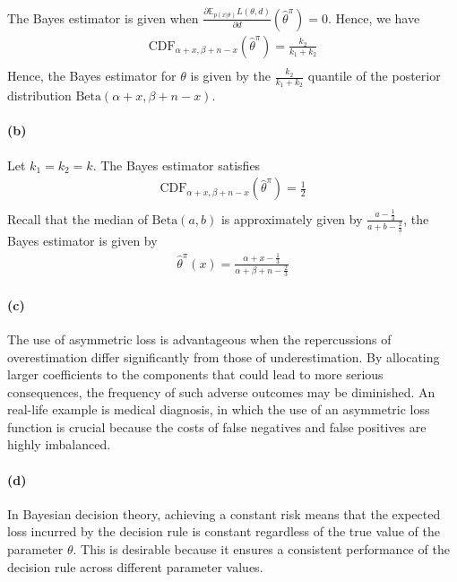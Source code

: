 The Bayes estimator is given when $\frac{\partial \mathbb{E}_{p(x \vert \theta)} L(\theta, d)}{\partial d} (\hat{\theta}^\pi) = 0$. Hence, we have
\begin{align*}
    \mathrm{CDF}_{\alpha+x, \beta+n-x}(\hat{\theta}^{\pi}) = \frac{k_2}{k_1+k_2}\\
\end{align*}
Hence, the Bayes estimator for $\theta$ is given by the $\frac{k_2}{k_1+k_2}$ quantile of the posterior distribution $\mathrm{Beta}(\alpha+x, \beta+n-x)$.

\paragraph{(b)}
Let $k_1 = k_2 = k$. The Bayes estimator satisfies
\begin{align*}
    \mathrm{CDF}_{\alpha+x, \beta+n-x}(\hat{\theta}^{\pi}) = \frac{1}{2}\\
\end{align*}
Recall that the median of $\mathrm{Beta}(a, b)$ is approximately given by $\frac{a-\frac{1}{3}}{a+b-\frac{2}{3}}$, the Bayes estimator is given by
\begin{align*}
    \hat{\theta}^{\pi}(x) = \frac{\alpha+x - \frac{1}{3}}{\alpha+\beta+n - \frac{2}{3}}
\end{align*}

\paragraph{(c)}
The use of asymmetric loss is advantageous when the repercussions of overestimation differ significantly from those of underestimation. By allocating larger coefficients to the components that could lead to more serious consequences, the frequency of such adverse outcomes may be diminished. An real-life example is medical diagnosis, in which the use of an asymmetric loss function is crucial because the costs of false negatives and false positives are highly imbalanced. 

\paragraph{(d)}
In Bayesian decision theory, achieving a constant risk means that the expected loss incurred by the decision rule is constant regardless of the true value of the parameter $\theta$. This is desirable because it ensures a consistent performance of the decision rule across different parameter values.

